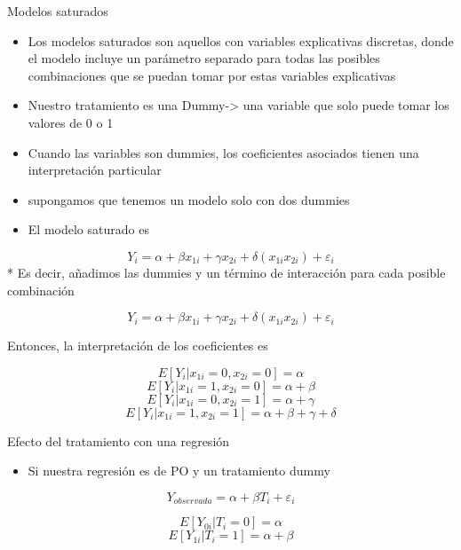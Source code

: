 \documentclass[
  ignorenonframetext,
]{beamer}
\providecommand{\tightlist}{%
  \setlength{\itemsep}{0pt}\setlength{\parskip}{0pt}}
\begin{document}
\begin{frame}{Modelos saturados}
\protect\hypertarget{modelos-saturados}{}
\begin{itemize}
\tightlist
\item
  Los modelos saturados son aquellos con variables explicativas
  discretas, donde el modelo incluye un parámetro separado para todas
  las posibles combinaciones que se puedan tomar por estas variables
  explicativas
\item
  Nuestro tratamiento es una Dummy-\textgreater{} una variable que solo
  puede tomar los valores de 0 o 1
\end{itemize}
\end{frame}

\begin{frame}{}
\protect\hypertarget{section-22}{}
\begin{itemize}
\tightlist
\item
  Cuando las variables son dummies, los coeficientes asociados tienen
  una interpretación particular
\item
  supongamos que tenemos un modelo solo con dos dummies
\item
  El modelo saturado es
\end{itemize}

\[Y_i=\alpha+ \beta x_{1i}+ \gamma x_{2i}+ \delta(x_{1i}x_{2i})+\varepsilon_i \]
* Es decir, añadimos las dummies y un término de interacción para cada
posible combinación
\end{frame}

\begin{frame}{}
\protect\hypertarget{section-23}{}
\[Y_i=\alpha+ \beta x_{1i}+ \gamma x_{2i}+ \delta(x_{1i}x_{2i})+\varepsilon_i \]

Entonces, la interpretación de los coeficientes es

\[E[Y_i| x_{1i}=0, x_{2i}=0]=\alpha\]
\[E[Y_i| x_{1i}=1, x_{2i}=0]=\alpha+\beta\]
\[E[Y_i| x_{1i}=0, x_{2i}=1]=\alpha+\gamma\]
\[E[Y_i| x_{1i}=1, x_{2i}=1]=\alpha+\beta+ \gamma+ \delta\]
\end{frame}

\begin{frame}{Efecto del tratamiento con una regresión}
\protect\hypertarget{efecto-del-tratamiento-con-una-regresiuxf3n}{}
\begin{itemize}
\tightlist
\item
  Si nuestra regresión es de PO y un tratamiento dummy
\end{itemize}

\[Y_{observada}= \alpha+ \beta T_i+ \varepsilon_i\]

\[E[Y_{0i}| T_i=0]=\alpha\] \[E[Y_{1i}| T_i=1]=\alpha+\beta\]
\end{frame}
\end{document}
